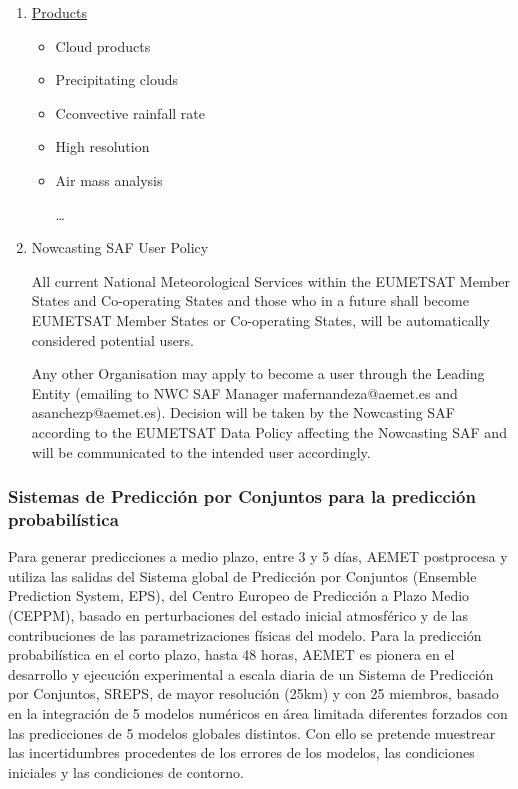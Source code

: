 \documentclass[11pt]{article}
\begin{document}
\begin{enumerate}
\item \href{http://www.nwcsaf.org/indexScientificDocumentation.html}{Products}
\label{sec-2-5-3-1}
\begin{itemize}
\item Cloud products
\item Precipitating clouds
\item Cconvective rainfall rate
\item High resolution
\item Air mass analysis
\item [\ldots{}]
\end{itemize}
\item Nowcasting SAF User Policy
\label{sec-2-5-3-2}

All current National Meteorological Services within the EUMETSAT
Member States and Co-operating States and those who in a future
shall become EUMETSAT Member States or Co-operating States, will
be automatically considered potential users.

Any other Organisation may apply to become a user through the
Leading Entity (emailing to NWC SAF Manager mafernandeza@aemet.es
and asanchezp@aemet.es). Decision will be taken by the Nowcasting
SAF according to the EUMETSAT Data Policy affecting the Nowcasting
SAF and will be communicated to the intended user accordingly.
\end{enumerate}
\subsubsection{Sistemas de Predicción por Conjuntos para la predicción probabilística}
\label{sec-2-5-4}
Para generar predicciones a medio plazo, entre 3 y 5 días, AEMET
postprocesa y utiliza las salidas del Sistema global de Predicción
por Conjuntos (Ensemble Prediction System, EPS), del Centro
Europeo de Predicción a Plazo Medio (CEPPM), basado en
perturbaciones del estado inicial atmosférico y de las
contribuciones de las parametrizaciones físicas del modelo. Para
la predicción probabilística en el corto plazo, hasta 48 horas,
AEMET es pionera en el desarrollo y ejecución experimental a
escala diaria de un Sistema de Predicción por Conjuntos, SREPS, de
mayor resolución (25km) y con 25 miembros, basado en la
integración de 5 modelos numéricos en área limitada diferentes
forzados con las predicciones de 5 modelos globales distintos. Con
ello se pretende muestrear las incertidumbres procedentes de los
errores de los modelos, las condiciones iniciales y las
condiciones de contorno.
\end{document}
